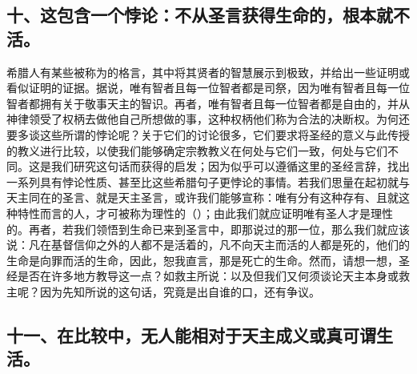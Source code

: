 \subsection{十、这包含一个悖论：不从圣言获得生命的，根本就不活。}

希腊人有某些被称为的格言，其中将其贤者的智慧展示到极致，并给出一些证明或看似证明的证据。据说，唯有智者且每一位智者都是司祭，因为唯有智者且每一位智者都拥有关于敬事天主的智识。再者，唯有智者且每一位智者都是自由的，并从神律领受了权柄去做他自己所想做的事，这种权柄他们称为合法的决断权。为何还要多谈这些所谓的悖论呢？关于它们的讨论很多，它们要求将圣经的意义与此传授的教义进行比较，以使我们能够确定宗教教义在何处与它们一致，何处与它们不同。这是我们研究这句话而获得的启发；因为似乎可以遵循这里的圣经言辞，找出一系列具有悖论性质、甚至比这些希腊句子更悖论的事情。若我们思量在起初就与天主同在的圣言、就是天主圣言，或许我们能够宣称：唯有分有这种存有、且就这种特性而言的人，才可被称为理性的（）；由此我们就应证明唯有圣人才是理性的。再者，若我们领悟到生命已来到圣言中，即那说过的那一位，那么我们就应该说：凡在基督信仰之外的人都不是活着的，凡不向天主而活的人都是死的，他们的生命是向罪而活的生命，因此，恕我直言，那是死亡的生命。然而，请想一想，圣经是否在许多地方教导这一点？如救主所说：以及但我们又何须谈论天主本身或救主呢？因为先知所说的这句话，究竟是出自谁的口，还有争议。\par


\subsection{十一、在比较中，无人能相对于天主成义或真可谓生活。}

